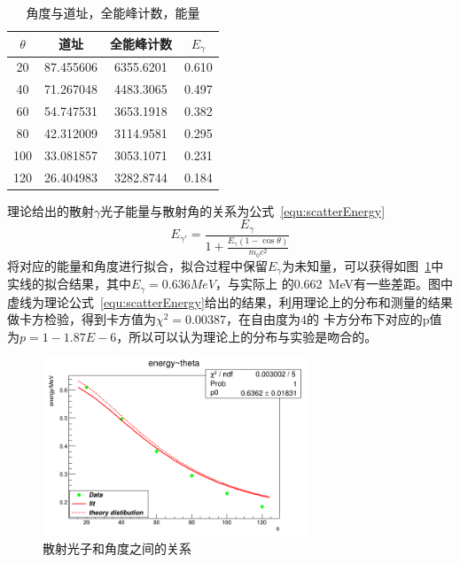 \documentclass[10pt]{ctexart}
\begin{document}
\begin{table}
    \begin{tabular}{|c|c|c|c|}
        \textbf{$\theta$} & \textbf{道址}& \textbf{全能峰计数}& \textbf{$E_{\gamma}$}\\
        \hline
                 20   &87.455606 & 6355.6201 &0.610\\
                40 & 71.267048 & 4483.3065 &0.497\\
                60 & 54.747531 & 3653.1918 &0.382\\
                80 & 42.312009 & 3114.9581 &0.295\\
                100 & 33.081857 & 3053.1071 &0.231\\
                120 & 26.404983 & 3282.8744&0.184\\
    \end{tabular}
    \centering
    \caption{角度与道址，全能峰计数，能量}
    \label{tab:gammaEnergy}
\end{table}
理论给出的散射$\gamma$光子能量与散射角的关系为公式~\ref{equ:scatterEnergy}
\begin{equation}
    E_{\gamma'}=\frac{E_\gamma}{1+\frac{E_\gamma(1-\cos{\theta})}{m_0c^2}}
    \label{equ:scatterEnergy}
\end{equation}
将对应的能量和角度进行拟合，拟合过程中保留$E_\gamma$为未知量，可以获得如图~\ref{fig:thetaEnergy}中实线的拟合结果，其中$E_\gamma=0.636MeV$，与实际上
的\SI{0.662}{MeV}有一些差距。图中虚线为理论公式~\ref{equ:scatterEnergy}给出的结果，利用理论上的分布和测量的结果做卡方检验，得到卡方值为$\chi^2=0.00387$，在自由度为4的
卡方分布下对应的p值为$p=1-1.87E-6$，所以可以认为理论上的分布与实验是吻合的。
\begin{figure}[htbp]
    \centering
    \includegraphics[width=0.7\textwidth]{data/scatterPhoton.png}
    \caption{散射光子和角度之间的关系}
    \label{fig:thetaEnergy}
\end{figure}
\end{document}
